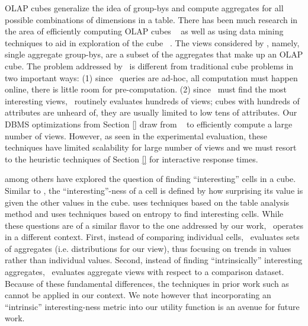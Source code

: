 OLAP cubes generalize the idea of group-bys and compute aggregates for all
possible combinations of dimensions in a table.
There has been much research in the area of efficiently computing OLAP cubes 
~\cite{DBLP:jounral/DMKD/GrayCBLR97,  DBLP:conf/VLDB/AgarwalADG96} as well as 
using data mining techniques to aid in exploration of the cube 
~\cite{DBLP:conf/vldb/Sarawagi99, DBLP:conf/vldb/SatheS01, DBLP:conf/vldb/Sarawagi00, 
DBLP:conf/SIGKDD/OrdonezC09}. 
The views considered by \SeeDB, namely, single aggregate group-bys, are a subset of the 
aggregates that make up an OLAP cube. 
The problem addressed by \SeeDB\ is different from traditional cube problems in two important 
ways: 
(1) since \SeeDB\ queries are ad-hoc, all computation must happen online, there is
little room for pre-computation.
(2) since \SeeDB\ must find the most interesting views, \SeeDB\ routinely evaluates hundreds of 
views; cubes with hundreds of attributes are unheard of, they are usually limited to low tens 
of attributes. 
Our DBMS optimizations from Section \ref{} draw from ~\cite{DBLP:jounral/DMKD/GrayCBLR97, 
DBLP:conf/VLDB/AgarwalADG96} to efficiently compute a large number of views. 
However, as seen in the experimental evaluation, these techniques have limited scalability for
large number of views and we must resort to the heuristic techniques of Section \ref{}
for interactive response times.

\cite{DBLP:conf/EDBT/SarawagiAM98, DBLP:conf/vldb/Sarawagi00} among others have explored 
the question of finding ``interesting'' cells in a cube.
Similar to \SeeDB, the ``interesting''-ness of a cell is defined by how surprising
its value is given the other values in the cube.
\cite{DBLP:conf/EDBT/SarawagiAM98} uses techniques based on the table analysis method and
\cite{DBLP:conf/vldb/Sarawagi00} uses techniques based on entropy to find interesting cells.
While these questions are of a similar flavor to the one addressed by our work, \SeeDB\ operates
in a different context.
First, instead of comparing individual cells, \SeeDB\ evaluates sets of aggregates (i.e. distributions
for our view), thus focusing on trends in values rather than individual values.
Second, instead of finding ``intrinsically'' interesting aggregates, \SeeDB\ evaluates aggregate views
with respect to a comparison dataset. 
Because of these fundamental differences, the techniques in prior work such as \cite{DBLP:conf/EDBT/SarawagiAM98, 
DBLP:conf/vldb/Sarawagi00} cannot be applied in our context.
We note however that incorporating an ``intrinsic'' interesting-ness metric into our utility function is an
avenue for future work.

